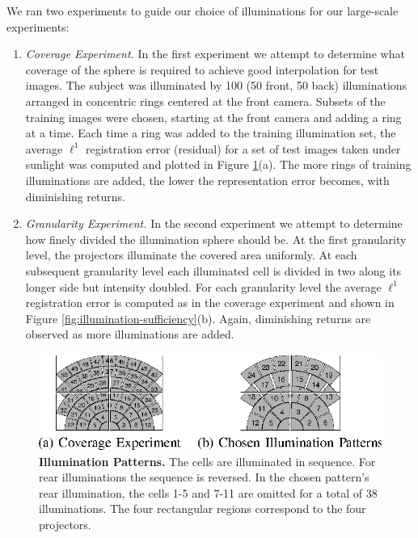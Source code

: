 \documentclass[10pt,journal,letterpaper,compsoc]{IEEEtran}
\begin{document}
We ran two experiments to guide our choice of illuminations for
our large-scale experiments:
\begin{enumerate}
\item {\em Coverage Experiment.} In the first experiment we
    attempt to determine what coverage of the sphere is
    required to achieve good interpolation for test images.
    The subject was illuminated by 100 (50 front, 50 back)
    illuminations arranged in concentric rings centered at
    the front camera.  Subsets of the training images were
    chosen, starting at the front camera and adding a ring
    at a time.  Each time a ring was added to the training
    illumination set, the average $\ell^1$ registration
    error (residual) for a set of test images taken under
    sunlight was computed and plotted in Figure
    \ref{fig:illumination-patterns}(a).  The more rings of
    training illuminations are added, the lower the
    representation error becomes, with diminishing returns.
\item {\em Granularity Experiment.} In the second
    experiment we attempt to determine how finely divided
    the illumination sphere should be.  At the first
    granularity level, the projectors  illuminate the
    covered area uniformly.  At each subsequent granularity
    level each illuminated cell is divided in two along its
    longer side but intensity doubled.  For each
    granularity level the average $\ell^1$ registration
    error is computed as in the coverage experiment and
    shown in Figure \ref{fig:illumination-sufficiency}(b).
    Again, diminishing returns are observed as more
    illuminations are added.
\end{enumerate}
\begin{figure}
\centering
\includegraphics{Figure_7}
\caption{{\bf Illumination Patterns.}   The cells are illuminated in sequence.  For rear illuminations the sequence is reversed.  In the chosen pattern's rear illumination, the cells 1-5 and 7-11 are omitted for a total of 38 illuminations. The four rectangular regions correspond to the four projectors.  }
\label{fig:illumination-patterns}
\vspace{-.75em}
\end{figure}
\end{document}
